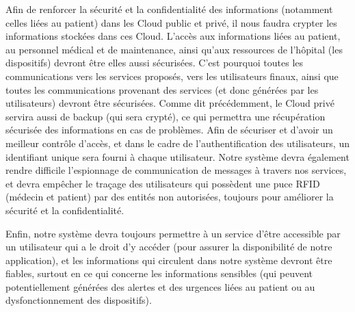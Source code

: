 Afin de renforcer la sécurité et la confidentialité des informations (notamment celles liées au patient) dans les Cloud public et privé, il nous faudra crypter les informations stockées dans ces Cloud. L'accès aux informations liées au patient, au personnel médical et de maintenance, ainsi qu'aux ressources de l'hôpital (les dispositifs) devront être elles aussi sécurisées. C'est pourquoi toutes les communications vers les services proposés, vers les utilisateurs finaux, ainsi que toutes les communications provenant des services (et donc générées par les utilisateurs) devront être sécurisées. Comme dit précédemment, le Cloud privé servira aussi de backup (qui sera crypté), ce qui permettra une récupération sécurisée des informations en cas de problèmes. Afin de sécuriser et d'avoir un meilleur contrôle d'accès, et dans le cadre de l'authentification des utilisateurs, un identifiant unique sera fourni à chaque utilisateur. Notre système devra également rendre difficile l'espionnage de communication de messages à travers nos services, et devra empêcher le traçage des utilisateurs qui possèdent une puce RFID (médecin et patient) par des entités non autorisées, toujours pour améliorer la sécurité et la confidentialité. 

Enfin, notre système devra toujours permettre à un service d'être accessible par un utilisateur qui a le droit d'y accéder (pour assurer la disponibilité de notre application), et les informations qui circulent dans notre système devront être fiables, surtout en ce qui concerne les informations sensibles (qui peuvent potentiellement générées des alertes et des urgences liées au patient ou au dysfonctionnement des dispositifs).
